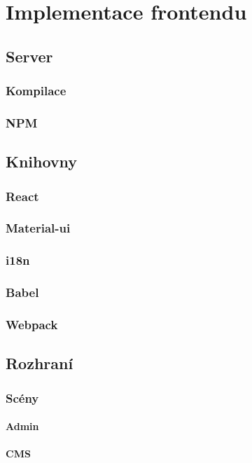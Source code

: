 \chapter{Implementace frontendu}

\section{Server}
\subsection{Kompilace}
\subsection{NPM}

\section{Knihovny}
\subsection{React}
\subsection{Material-ui}
\subsection{i18n}
\subsection{Babel}
\subsection{Webpack}

\section{Rozhraní}
\subsection{Scény}
\subsubsection{Admin}
\subsubsection{CMS}
